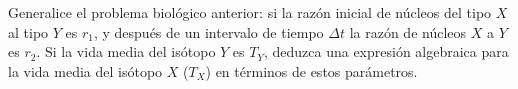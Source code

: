 \item Generalice el problema biológico anterior: si la razón inicial de núcleos del tipo $X$ al tipo $Y$ es $r_1$, y después de un intervalo de tiempo $\Delta t$ la razón de núcleos $X$ a $Y$ es $r_2$. Si la vida media del isótopo $Y$ es $T_Y$, deduzca una expresión algebraica para la vida media del isótopo $X$ ($T_X$) en términos de estos parámetros.